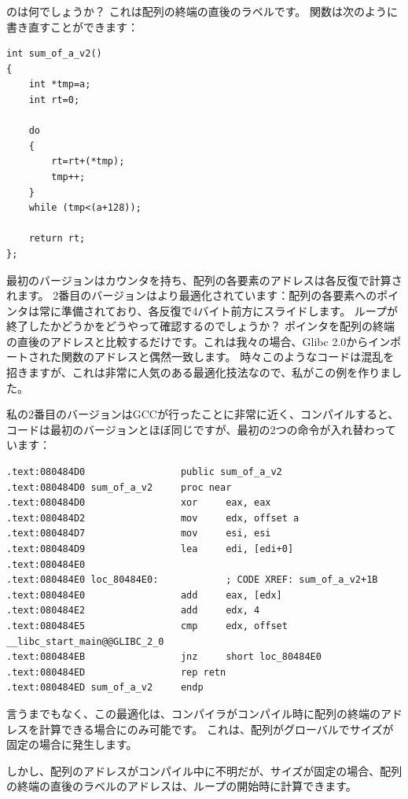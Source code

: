 のは何でしょうか？
これは配列の終端の直後のラベルです。
関数は次のように書き直すことができます：

\begin{lstlisting}[style=customc]
int sum_of_a_v2()
{
	int *tmp=a;
	int rt=0;
	
	do
	{
		rt=rt+(*tmp);
		tmp++;
	}
	while (tmp<(a+128));

	return rt;
};
\end{lstlisting}

最初のバージョンはカウンタを持ち、配列の各要素のアドレスは各反復で計算されます。
2番目のバージョンはより最適化されています：配列の各要素へのポインタは常に準備されており、各反復で4バイト前方にスライドします。
ループが終了したかどうかをどうやって確認するのでしょうか？
ポインタを配列の終端の直後のアドレスと比較するだけです。これは我々の場合、Glibc 2.0からインポートされた関数のアドレスと偶然一致します。
時々このようなコードは混乱を招きますが、これは非常に人気のある最適化技法なので、私がこの例を作りました。

私の2番目のバージョンはGCCが行ったことに非常に近く、コンパイルすると、コードは最初のバージョンとほぼ同じですが、最初の2つの命令が入れ替わっています：

\begin{lstlisting}[style=customasmx86]
.text:080484D0                 public sum_of_a_v2
.text:080484D0 sum_of_a_v2     proc near
.text:080484D0                 xor     eax, eax
.text:080484D2                 mov     edx, offset a
.text:080484D7                 mov     esi, esi
.text:080484D9                 lea     edi, [edi+0]
.text:080484E0
.text:080484E0 loc_80484E0:            ; CODE XREF: sum_of_a_v2+1B
.text:080484E0                 add     eax, [edx]
.text:080484E2                 add     edx, 4
.text:080484E5                 cmp     edx, offset __libc_start_main@@GLIBC_2_0
.text:080484EB                 jnz     short loc_80484E0
.text:080484ED                 rep retn
.text:080484ED sum_of_a_v2     endp
\end{lstlisting}

言うまでもなく、この最適化は、コンパイラがコンパイル時に配列の終端のアドレスを計算できる場合にのみ可能です。
これは、配列がグローバルでサイズが固定の場合に発生します。

しかし、配列のアドレスがコンパイル中に不明だが、サイズが固定の場合、配列の終端の直後のラベルのアドレスは、ループの開始時に計算できます。
